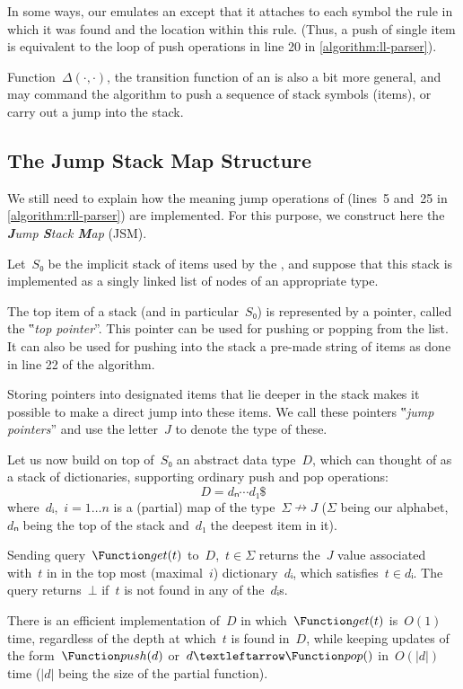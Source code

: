 In some ways, our \RLLp emulates an \LLp except that it attaches to each symbol
the rule in which it was found and the location within this rule.
(Thus, a push of single item is equivalent to the loop of push operations in
line 20 in \cref{algorithm:ll-parser}).

Function~$Δ(·,·)$, the transition function of an \RLLp is also a bit more
general, and may command the algorithm to push a sequence of stack symbols
(items), or carry out a jump into the stack.

\subsection{The Jump Stack Map Structure}
\label{section:jump}
We still need to explain how the meaning jump operations of \RLLp (lines~5
and~25 in \cref{algorithm:rll-parser}) are implemented. For this purpose, we
construct here the \emph{\textbf Jump \textbf Stack \textbf Map} (JSM).

Let~$S₀$ be the implicit stack of items used by the \RLLp, and suppose that
this stack is implemented as a singly linked list of nodes of an appropriate
type.

The top item of a stack (and in particular~$S₀$) is represented by a pointer,
called the ‟\emph{top pointer}”. This pointer can be used for pushing or
popping from the list. It can also be used for pushing into the stack a
pre-made string of items as done in line 22 of the \RLLp algorithm.

Storing pointers into designated items that lie deeper in the stack makes it
possible to make a direct jump into these items. We call these pointers
‟\emph{jump pointers}” and use the letter~$J$ to denote the type of these.

Let us now build on top of~$S₀$ an abstract data type~$D$, which can thought of
as a stack of dictionaries, supporting ordinary push and pop operations:
\[
  D=dₙ⋯d₁\$
\]
where~$dᵢ$,~$i=1…n$ is a (partial) map of the type~$Σ↛J$ ($Σ$ being our
alphabet,~$dₙ$ being the top of the stack and~$d₁$ the deepest item in it).

Sending query~$\Function get(t)$ to~$D$,~$t∈Σ$ returns the~$J$ value
associated with~$t$ in in the top most (maximal~$i$) dictionary~$dᵢ$, which
satisfies~$t∈dᵢ$. The query returns~$⊥$ if~$t$ is not found in any of
the~$dᵢ$s.

There is an efficient implementation of~$D$ in which~$\Function get(t)$
is~$O(1)$ time, regardless of the depth at which~$t$ is found in~$D$, while
keeping updates of the form~$\Function push(d)$ or~$d←\Function pop()$
in~$O(|d|)$ time ($|d|$ being the size of the partial function).

